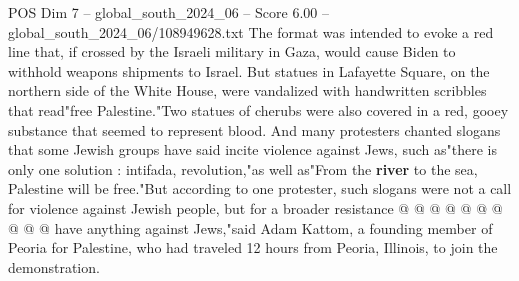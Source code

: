 \begin{textsample}{POS Dim 7 – global\_south\_2024\_06 – Score 6.00 – global\_south\_2024\_06/108949628.txt}
The format was intended to evoke a red line that, if crossed by the Israeli military in Gaza, would cause Biden to withhold weapons shipments to Israel.
But statues in Lafayette Square, on the northern side of the White House, were vandalized with handwritten scribbles that read"free Palestine."Two statues of cherubs were also covered in a red, gooey substance that seemed to represent blood.
And many protesters chanted slogans that some Jewish groups have said incite violence against Jews, such as"there is only one solution : intifada, revolution,"as well as"From the \textbf{river} to the sea, Palestine will be free."But according to one protester, such slogans were not a call for violence against Jewish people, but for a broader resistance @ @ @ @ @ @ @ @ @ @ have anything against Jews,"said Adam Kattom, a founding member of Peoria for Palestine, who had traveled 12 hours from Peoria, Illinois, to join the demonstration.

\end{textsample}

